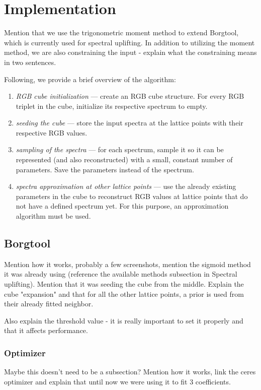 \chapter{Implementation}

Mention that we use the trigonometric moment method to extend Borgtool, which is currently used for spectral uplifting. In addition to utilizing the moment method, we are also constraining the input - explain what the constraining means in two sentences.

Following, we provide a brief overview of the algorithm:
\begin{enumerate}[label=S.\arabic*]
	\item \emph{RGB cube initialization} --- create an RGB cube structure. For every RGB triplet in the cube, initialize its respective spectrum to empty.
	\item \emph{seeding the cube} --- store the input spectra at the lattice points with their respective RGB values.
	\item \emph{sampling of the spectra} --- for each spectrum, sample it so it can be represented (and also reconstructed) with a small, constant number of parameters. Save the parameters instead of the spectrum.
	\item \label{Step 4} \emph{spectra approximation at other lattice points} --- use the already existing parameters in the cube to reconstruct RGB values at lattice points that do not have a defined spectrum yet. For this purpose, an approximation algorithm must be used.
\end{enumerate}

\section{Borgtool}

Mention how it works, probably a few screenshots, mention the sigmoid method it was already using (reference the available methods subsection in Spectral uplifting). Mention that it was seeding the cube from the middle. Explain the cube "expansion" and that for all the other lattice points, a prior is used from their already fitted neighbor.

Also explain the threshold value - it is really important to set it properly and that it affects performance.

\subsection{Optimizer}
Maybe this doesn't need to be a subsection? Mention how it works, link the ceres optimizer and explain that until now we were using it to fit 3 coefficients.

